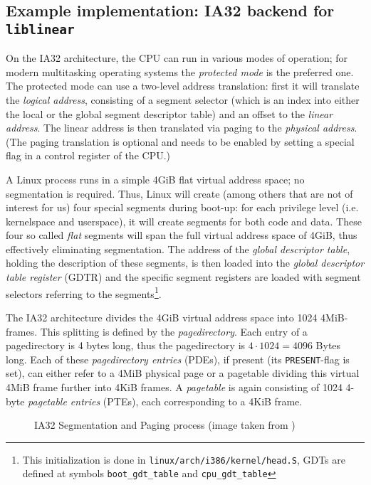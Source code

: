 \subsection{Example implementation: IA32 backend for \texttt{liblinear}}

On the IA32 architecture, the CPU can run in various modes of operation; for
modern multitasking operating systems the \emph{protected mode} is the preferred
one.  The protected mode can use a two-level address translation: first it will
translate the \emph {logical address}, consisting of a segment selector (which
is an index into either the local or the global segment descriptor table) and an
offset to the \emph{linear address}.  The linear address is then translated via
paging to the \emph{physical address}. (The paging translation is optional and
needs to be enabled by setting a special flag in a control register of the CPU.)

\label{linux_gdt} A Linux process runs in a simple 4GiB flat virtual address
space; no segmentation is required. Thus, Linux will create (among others that
are not of interest for us) four special segments during boot-up: for each
privilege level (i.e. kernelspace and userspace), it will create segments for
both code and data. These four so called \emph{flat} segments will span the full
virtual address space of 4GiB, thus effectively eliminating segmentation. The
address of the \emph{global descriptor table}, holding the description of these
segments, is then loaded into the \emph{global descriptor table register} (GDTR)
and the specific segment registers are loaded with segment selectors referring
to the segments\footnote{This initialization is done in
\texttt{linux/arch/i386/kernel/head.S}, GDTs are defined at symbols
\texttt{boot\_gdt\_table} and \texttt{cpu\_gdt\_table}}.

The IA32 architecture divides the 4GiB virtual address space into 1024
4MiB-frames. This splitting is defined by the \emph{pagedirectory}. Each entry
of a pagedirectory is 4 bytes long, thus the pagedirectory is $4 \cdot 1024 =
4096$ Bytes long. Each of these \emph{pagedirectory entries} (PDEs), if present
(its \texttt{PRESENT}-flag is set), can either refer to a 4MiB physical page or
a pagetable dividing this virtual 4MiB frame further into 4KiB frames. A
\emph{pagetable} is again consisting of 1024 4-byte \emph{pagetable entries}
(PTEs), each corresponding to a 4KiB frame.

\begin{figure}[ht] \begin{center}



	\caption{IA32 Segmentation and Paging process (image taken from
	\cite{IA32_SDM_3a:2006})}

	\label{fig:ia32_segmentation_paging}

\end{center}\end{figure}

